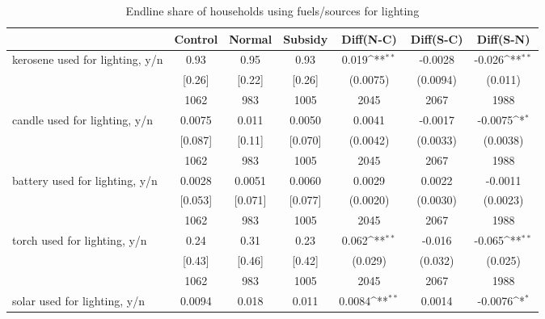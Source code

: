 \begin{table}[htbp]\centering
\def\sym#1{\ifmmode^{#1}\else\(^{#1}\)\fi}
\caption{Endline share of households using fuels/sources for lighting \label{tab:"balance"}}
\begin{tabular*}{1\hsize}{@{\hskip\tabcolsep\extracolsep\fill}l*{1}{cccccc}}
\toprule
                                &  Control&   Normal&  Subsidy&Diff(N-C)         &Diff(S-C)         &Diff(S-N)         \\
\midrule
kerosene used for lighting, y/n &     0.93&     0.95&     0.93&    0.019\sym{**} &  -0.0028         &   -0.026\sym{**} \\
                                &   [0.26]&   [0.22]&   [0.26]& (0.0075)         & (0.0094)         &  (0.011)         \\
                                &     1062&      983&     1005&     2045         &     2067         &     1988         \\
candle used for lighting, y/n   &   0.0075&    0.011&   0.0050&   0.0041         &  -0.0017         &  -0.0075\sym{*}  \\
                                &  [0.087]&   [0.11]&  [0.070]& (0.0042)         & (0.0033)         & (0.0038)         \\
                                &     1062&      983&     1005&     2045         &     2067         &     1988         \\
battery used for lighting, y/n  &   0.0028&   0.0051&   0.0060&   0.0029         &   0.0022         &  -0.0011         \\
                                &  [0.053]&  [0.071]&  [0.077]& (0.0020)         & (0.0030)         & (0.0023)         \\
                                &     1062&      983&     1005&     2045         &     2067         &     1988         \\
torch used for lighting, y/n    &     0.24&     0.31&     0.23&    0.062\sym{**} &   -0.016         &   -0.065\sym{**} \\
                                &   [0.43]&   [0.46]&   [0.42]&  (0.029)         &  (0.032)         &  (0.025)         \\
                                &     1062&      983&     1005&     2045         &     2067         &     1988         \\
solar used for lighting, y/n    &   0.0094&    0.018&    0.011&   0.0084\sym{**} &   0.0014         &  -0.0076\sym{*}  \\

\end{tabular*}
\end{table}
